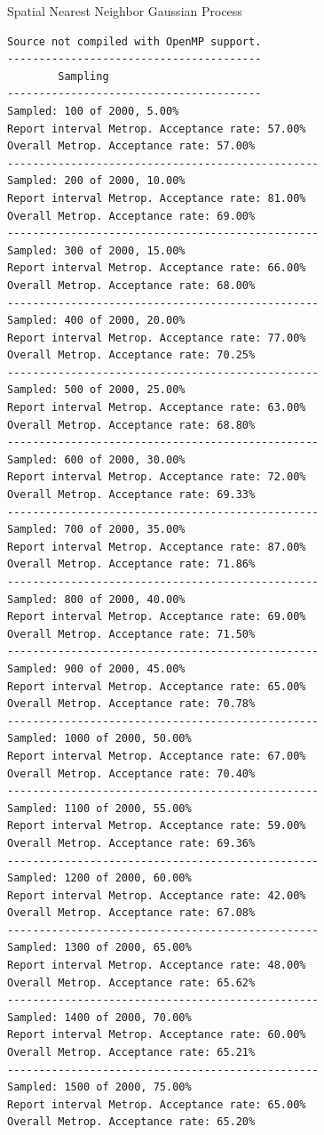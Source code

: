 \documentclass[
  ignorenonframetext,
]{beamer}
\begin{document}
\begin{frame}[fragile]{Spatial Nearest Neighbor Gaussian Process}
\begin{verbatim}
Source not compiled with OpenMP support.
----------------------------------------
        Sampling
----------------------------------------
Sampled: 100 of 2000, 5.00%
Report interval Metrop. Acceptance rate: 57.00%
Overall Metrop. Acceptance rate: 57.00%
-------------------------------------------------
Sampled: 200 of 2000, 10.00%
Report interval Metrop. Acceptance rate: 81.00%
Overall Metrop. Acceptance rate: 69.00%
-------------------------------------------------
Sampled: 300 of 2000, 15.00%
Report interval Metrop. Acceptance rate: 66.00%
Overall Metrop. Acceptance rate: 68.00%
-------------------------------------------------
Sampled: 400 of 2000, 20.00%
Report interval Metrop. Acceptance rate: 77.00%
Overall Metrop. Acceptance rate: 70.25%
-------------------------------------------------
Sampled: 500 of 2000, 25.00%
Report interval Metrop. Acceptance rate: 63.00%
Overall Metrop. Acceptance rate: 68.80%
-------------------------------------------------
Sampled: 600 of 2000, 30.00%
Report interval Metrop. Acceptance rate: 72.00%
Overall Metrop. Acceptance rate: 69.33%
-------------------------------------------------
Sampled: 700 of 2000, 35.00%
Report interval Metrop. Acceptance rate: 87.00%
Overall Metrop. Acceptance rate: 71.86%
-------------------------------------------------
Sampled: 800 of 2000, 40.00%
Report interval Metrop. Acceptance rate: 69.00%
Overall Metrop. Acceptance rate: 71.50%
-------------------------------------------------
Sampled: 900 of 2000, 45.00%
Report interval Metrop. Acceptance rate: 65.00%
Overall Metrop. Acceptance rate: 70.78%
-------------------------------------------------
Sampled: 1000 of 2000, 50.00%
Report interval Metrop. Acceptance rate: 67.00%
Overall Metrop. Acceptance rate: 70.40%
-------------------------------------------------
Sampled: 1100 of 2000, 55.00%
Report interval Metrop. Acceptance rate: 59.00%
Overall Metrop. Acceptance rate: 69.36%
-------------------------------------------------
Sampled: 1200 of 2000, 60.00%
Report interval Metrop. Acceptance rate: 42.00%
Overall Metrop. Acceptance rate: 67.08%
-------------------------------------------------
Sampled: 1300 of 2000, 65.00%
Report interval Metrop. Acceptance rate: 48.00%
Overall Metrop. Acceptance rate: 65.62%
-------------------------------------------------
Sampled: 1400 of 2000, 70.00%
Report interval Metrop. Acceptance rate: 60.00%
Overall Metrop. Acceptance rate: 65.21%
-------------------------------------------------
Sampled: 1500 of 2000, 75.00%
Report interval Metrop. Acceptance rate: 65.00%
Overall Metrop. Acceptance rate: 65.20%

\end{verbatim}
\end{frame}
\end{document}
